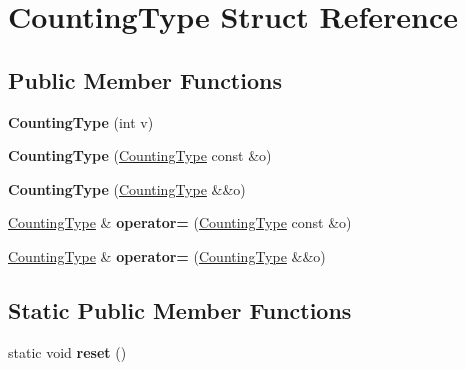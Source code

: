 \hypertarget{struct_counting_type}{}\section{Counting\+Type Struct Reference}
\label{struct_counting_type}
\subsection*{Public Member Functions}
\begin{DoxyCompactItemize}
\item 
\mbox{\label{struct_counting_type_a10e3aba1db1973f4d3968e191203e0e8}} 
{\bfseries Counting\+Type} (int v)
\item 
\mbox{\label{struct_counting_type_ab680ffb4051dd22815a4d317f8a358c5}} 
{\bfseries Counting\+Type} (\mbox{\hyperlink{struct_counting_type}{Counting\+Type}} const \&o)
\item 
\mbox{\label{struct_counting_type_a134cd1194c91b53d9e53638e586942d9}} 
{\bfseries Counting\+Type} (\mbox{\hyperlink{struct_counting_type}{Counting\+Type}} \&\&o)
\item 
\mbox{\label{struct_counting_type_a17b0b9c09dc43b7e8986b174de6c0b77}} 
\mbox{\hyperlink{struct_counting_type}{Counting\+Type}} \& {\bfseries operator=} (\mbox{\hyperlink{struct_counting_type}{Counting\+Type}} const \&o)
\item 
\mbox{\label{struct_counting_type_ac0fed18d7b33705568758d04d844d367}} 
\mbox{\hyperlink{struct_counting_type}{Counting\+Type}} \& {\bfseries operator=} (\mbox{\hyperlink{struct_counting_type}{Counting\+Type}} \&\&o)
\end{DoxyCompactItemize}
\subsection*{Static Public Member Functions}
\begin{DoxyCompactItemize}
\item 
\mbox{\label{struct_counting_type_ad0b2ebd79d5f00c854ca9fe4ddede976}} 
static void {\bfseries reset} ()
\end{DoxyCompactItemize}

